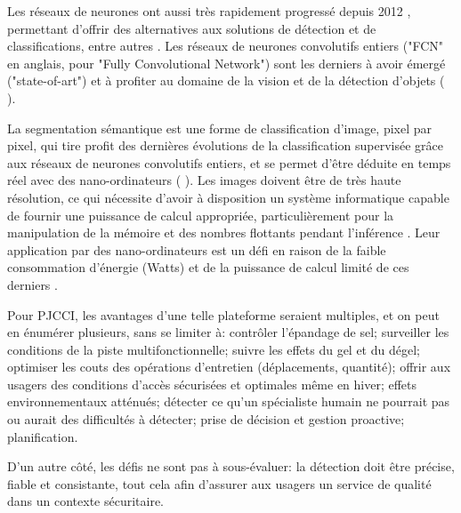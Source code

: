 \par Les réseaux de neurones ont aussi très rapidement progressé depuis 2012 \cite{beam_deep_2017}, permettant d'offrir des alternatives aux solutions de détection et de classifications, entre autres \cite{pathak_architecturally_2019}. Les réseaux de neurones convolutifs entiers ("FCN" en anglais, pour "Fully Convolutional Network") sont les derniers à avoir émergé ("state-of-art") \cite{jia_real-time_2020} et à profiter au domaine de la vision et de la détection d'objets (\cite{nguyen_mavnet_2019} \cite{jia_real-time_2020}).
\par La segmentation sémantique est une forme de classification d'image, pixel par pixel, qui tire profit des dernières évolutions de la classification supervisée grâce aux réseaux de neurones convolutifs entiers, et se permet d'être déduite en temps réel avec des nano-ordinateurs (\cite{long_fully_2015} \cite{blanco-filgueira_deep_2019}). Les images doivent être de très haute résolution, ce qui nécessite d'avoir à disposition un système informatique capable de fournir une puissance de calcul appropriée, particulièrement pour la manipulation de la mémoire et des nombres flottants pendant l'inférence \cite{mody_low_2018}. Leur application par des nano-ordinateurs est un défi en raison de la faible consommation d'énergie (Watts) et de la puissance de calcul limité de ces derniers \cite{copel_whats_2016}.
\par Pour PJCCI, les avantages d'une telle plateforme seraient multiples, et on peut en énumérer plusieurs, sans se limiter à: contrôler l'épandage de sel; surveiller les conditions de la piste multifonctionnelle; suivre les effets du gel et du dégel; optimiser les couts des opérations d'entretien (déplacements, quantité); offrir aux usagers des conditions d'accès sécurisées et optimales même en hiver; effets environnementaux atténués; détecter ce qu'un spécialiste humain ne pourrait pas ou aurait des difficultés à détecter; prise de décision et gestion proactive; planification.
\par D'un autre côté, les défis ne sont pas à sous-évaluer: la détection doit être précise, fiable et consistante, tout cela afin d'assurer aux usagers un service de qualité dans un contexte sécuritaire.
